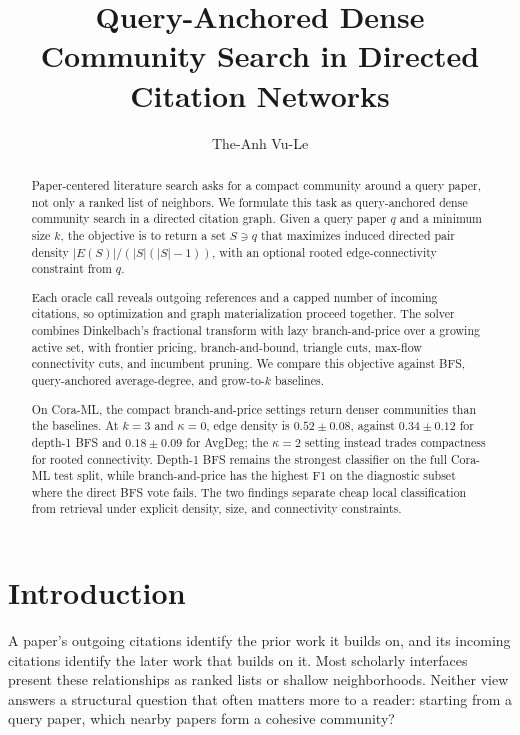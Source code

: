 \documentclass[12pt]{article}
\title{Query-Anchored Dense Community Search in Directed Citation Networks}
\author{The-Anh Vu-Le}
\date{}
\begin{document}
\maketitle

\begin{abstract}
  Paper-centered literature search asks for a compact community around a query paper, not only a ranked list of neighbors.  We formulate this task as query-anchored dense community search in a directed citation graph.  Given a query paper $q$ and a minimum size $k$, the objective is to return a set $S\ni q$ that maximizes induced directed pair density $|E(S)|/(|S|(|S|-1))$, with an optional rooted edge-connectivity constraint from $q$.

  Each oracle call reveals outgoing references and a capped number of incoming citations, so optimization and graph materialization proceed together.  The solver combines Dinkelbach's fractional transform with lazy branch-and-price over a growing active set, with frontier pricing, branch-and-bound, triangle cuts, max-flow connectivity cuts, and incumbent pruning.  We compare this objective against BFS, query-anchored average-degree, and grow-to-$k$ baselines.

  On Cora-ML, the compact branch-and-price settings return denser communities than the baselines.  At $k=3$ and $\kappa=0$, edge density is $0.52\pm0.08$, against $0.34\pm0.12$ for depth-1 BFS and $0.18\pm0.09$ for AvgDeg; the $\kappa=2$ setting instead trades compactness for rooted connectivity.  Depth-1 BFS remains the strongest classifier on the full Cora-ML test split, while branch-and-price has the highest F1 on the diagnostic subset where the direct BFS vote fails.  The two findings separate cheap local classification from retrieval under explicit density, size, and connectivity constraints.
\end{abstract}

\section{Introduction}
\label{sec:introduction}

A paper's outgoing citations identify the prior work it builds on, and its incoming citations identify the later work that builds on it.  Most scholarly interfaces present these relationships as ranked lists or shallow neighborhoods.  Neither view answers a structural question that often matters more to a reader: starting from a query paper, which nearby papers form a cohesive community?
\end{document}
